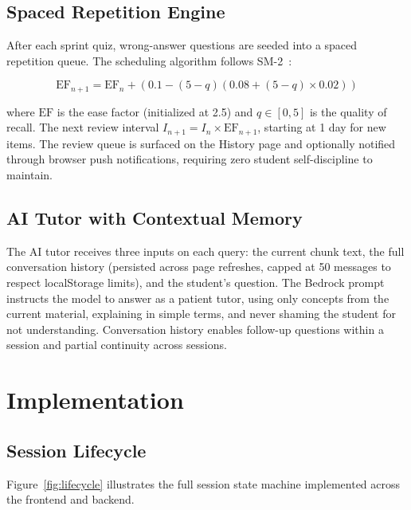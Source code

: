 \documentclass[conference]{IEEEtran}
\begin{document}
\subsection{Spaced Repetition Engine}

After each sprint quiz, wrong-answer questions are seeded into a spaced repetition queue. The scheduling algorithm follows SM-2~\cite{wozniak1990optimization}:

\begin{equation}
  \text{EF}_{n+1} = \text{EF}_n + (0.1 - (5 - q)(0.08 + (5 - q) \times 0.02))
\end{equation}

where $\text{EF}$ is the ease factor (initialized at 2.5) and $q \in [0, 5]$ is the quality of recall. The next review interval $I_{n+1} = I_n \times \text{EF}_{n+1}$, starting at 1 day for new items. The review queue is surfaced on the History page and optionally notified through browser push notifications, requiring zero student self-discipline to maintain.

\subsection{AI Tutor with Contextual Memory}

The AI tutor receives three inputs on each query: the current chunk text, the full conversation history (persisted across page refreshes, capped at 50 messages to respect localStorage limits), and the student's question. The Bedrock prompt instructs the model to answer as a patient tutor, using only concepts from the current material, explaining in simple terms, and never shaming the student for not understanding. Conversation history enables follow-up questions within a session and partial continuity across sessions.

\section{Implementation}

\subsection{Session Lifecycle}

Figure~\ref{fig:lifecycle} illustrates the full session state machine implemented across the frontend and backend.
\end{document}
